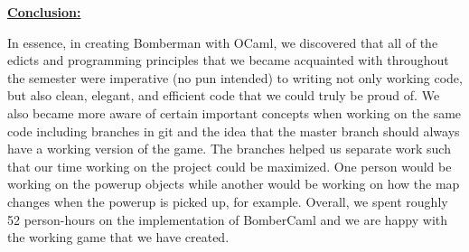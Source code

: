 \documentclass[12pt]{article}
\begin{document}
\vspace{\baselineskip}

\vspace{\baselineskip}
\textbf{\uline{Conclusion:}}\par

In essence, in creating Bomberman with OCaml, we discovered that all of the edicts and programming principles that we became acquainted with throughout the semester were imperative (no pun intended) to writing not only working code, but also clean, elegant, and efficient code that we could truly be proud of. We also became more aware of certain important concepts when working on the same code including branches in git and the idea that the master branch should always have a working version of the game. The branches helped us separate work such that our time working on the project could be maximized. One person would be working on the powerup objects while another would be working on how the map changes when the powerup is picked up, for example. Overall, we spent roughly 52 person-hours on the implementation of BomberCaml and we are happy with the working game that we have created.\par


\printbibliography
\end{document}

